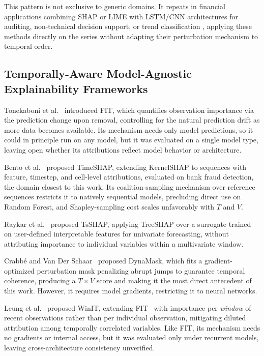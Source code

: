 \documentclass[runningheads]{llncs}
\begin{document}
This pattern is not exclusive to generic domains. It repeats in
financial applications combining SHAP or LIME with LSTM/CNN
architectures for auditing, non-technical decision support, or trend
classification \cite{gupta2025,sathyampeth2025,manikrao2026,
jagannathan2025,kumar2024,singh2025,muhammad2024}, applying these
methods directly on the series without adapting their perturbation
mechanism to temporal order.

\subsection{Temporally-Aware Model-Agnostic Explainability Frameworks}

Tonekaboni et al.~\cite{tonekaboni2020} introduced FIT, which
quantifies observation importance via the prediction change upon
removal, controlling for the natural prediction drift as more data
becomes available. Its mechanism needs only model predictions, so it
could in principle run on any model, but it was evaluated on a
single model type, leaving open whether its attributions reflect
model behavior or architecture.

Bento et al.~\cite{bento2021} proposed TimeSHAP, extending KernelSHAP
to sequences with feature, timestep, and cell-level attributions,
evaluated on bank fraud detection, the domain closest to this work.
Its coalition-sampling mechanism over reference sequences restricts
it to natively sequential models, precluding direct use on Random
Forest, and Shapley-sampling cost scales unfavorably with $T$ and
$V$.

Raykar et al.~\cite{raykar2023} proposed TsSHAP, applying TreeSHAP
over a surrogate trained on user-defined interpretable features for
univariate forecasting, without attributing importance to individual
variables within a multivariate window.

Crabbé and Van Der Schaar~\cite{crabbe2021} proposed DynaMask, which
fits a gradient-optimized perturbation mask penalizing abrupt jumps
to guarantee temporal coherence, producing a $T{\times}V$ score and
making it the most direct antecedent of this work. However, it
requires model gradients, restricting it to neural networks.

Leung et al.~\cite{leung2023winit} proposed WinIT, extending
FIT~\cite{tonekaboni2020} with importance per \emph{window} of recent
observations rather than per individual observation, mitigating
diluted attribution among temporally correlated variables. Like FIT,
its mechanism needs no gradients or internal access, but it was
evaluated only under recurrent models, leaving cross-architecture
consistency unverified.
\end{document}
